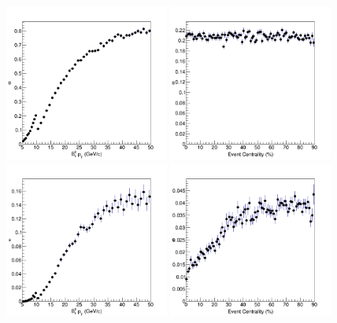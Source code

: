 \begin{figure}[h]
\begin{center}
\includegraphics[width=0.48\textwidth]{Figures/Chapter5/BsAcc1DPtHis.png}
\includegraphics[width=0.48\textwidth]{Figures/Chapter5/BsAcc1DCentHis.png}
\includegraphics[width=0.48\textwidth]{Figures/Chapter5/BsSel1DPtHis.png}
\includegraphics[width=0.48\textwidth]{Figures/Chapter5/BsSel1DCentHis.png}

\end{center}
\end{figure}
